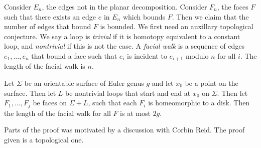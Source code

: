 Consider \(E_n\), the edges not in the planar decomposition. Consider \(F_n\), the faces \(F\) such that there exists an edge \(e\) in \(E_n\) which bounds \(F\). Then we claim that the number of edges that bound \(F\) is bounded. We first need an auxillary topological conjecture. We say a loop is \textit{trivial} if it is homotopy equivalent to a constant loop, and \textit{nontrivial} if this is not the case. A \textit{facial walk} is a sequence of edges \(e_1, \ldots, e_n\) that bound a face such that \(e_i\) is incident to \(e_{i + 1}\) modulo \(n\) for all \(i\). The length of the facial walk is \(n\).

\begin{lemma}\label{lem:orientable_facial_walks}
	Let \(\Sigma \) be an orientable surface of Euler genus \(g\) and let \(x_0\) be a point on the surface. Then let \(L\) be nontrivial loops that start and end at \(x_0\) on \(\Sigma \). Then let \(F_1, \ldots, F_j\) be faces on \(\Sigma + L\), such that each \(F_i\) is homeomorphic to a disk. Then the length of the facial walk for all \(F\) is at most \(2g\).
\end{lemma}

Parts of the proof was motivated by a discussion with Corbin Reid. The proof given is a topological one.

